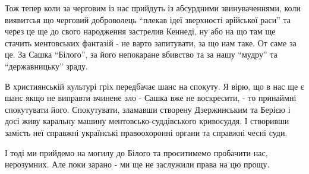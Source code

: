 Тож тепер коли за черговим із нас прийдуть із абсурдними звинуваченнями, коли
виявитсья що черговий доброволець \enquote{плекав ідеї зверхності арійської раси} та
через це ще до свого народження застрелив Кеннеді, ну або на що там ще стачить
ментовських фантазій - не варто запитувати, за що нам таке. От саме за це. За
Сашка \enquote{Білого}, за його непокаране вбивство та за нашу \enquote{мудру} та
\enquote{державницьку} зраду.

В християнській культурі гріх передбачає шанс на спокуту. Я вірю, що в нас ще є
шанс якщо не виправти вчинене зло - Сашка вже не воскресити, - то принаймні
спокутувати його. Спокутувати, зламавши створену Дзержинським та Берією і досі
живу каральну машину ментовсько-суддівського кривосуддя. І створивши замість
неї справжні українські правоохоронні органи та справжні чесні суди.

І тоді ми прийдемо на могилу до Білого та проситимемо пробачити нас,
нерозумних. Але поки зарано - ми ще не заслужили права на цю прощу.
